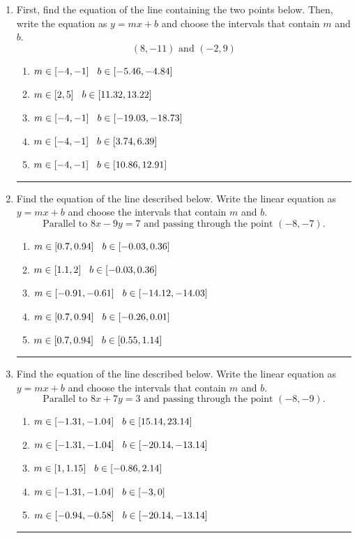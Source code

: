 \documentclass[14pt]{extbook}
\newcommand{\litem}[1]{\item#1\hspace*{-1cm}\rule{\textwidth}{0.4pt}}
\begin{document}
\begin{enumerate}
\litem{
First, find the equation of the line containing the two points below. Then, write the equation as $ y=mx+b $ and choose the intervals that contain $m$ and $b$.\[ (8, -11) \text{ and } (-2, 9) \]\begin{enumerate}[label=\Alph*.]
\item \( m \in [-4, -1] \hspace*{3mm} b \in [-5.46, -4.84] \)
\item \( m \in [2, 5] \hspace*{3mm} b \in [11.32, 13.22] \)
\item \( m \in [-4, -1] \hspace*{3mm} b \in [-19.03, -18.73] \)
\item \( m \in [-4, -1] \hspace*{3mm} b \in [3.74, 6.39] \)
\item \( m \in [-4, -1] \hspace*{3mm} b \in [10.86, 12.91] \)

\end{enumerate} }
\litem{
Find the equation of the line described below. Write the linear equation as $ y=mx+b $ and choose the intervals that contain $m$ and $b$.\[ \text{Parallel to } 8 x - 9 y = 7 \text{ and passing through the point } (-8, -7). \]\begin{enumerate}[label=\Alph*.]
\item \( m \in [0.7, 0.94] \hspace*{3mm} b \in [-0.03, 0.36] \)
\item \( m \in [1.1, 2] \hspace*{3mm} b \in [-0.03, 0.36] \)
\item \( m \in [-0.91, -0.61] \hspace*{3mm} b \in [-14.12, -14.03] \)
\item \( m \in [0.7, 0.94] \hspace*{3mm} b \in [-0.26, 0.01] \)
\item \( m \in [0.7, 0.94] \hspace*{3mm} b \in [0.55, 1.14] \)

\end{enumerate} }
\litem{
Find the equation of the line described below. Write the linear equation as $ y=mx+b $ and choose the intervals that contain $m$ and $b$.\[ \text{Parallel to } 8 x + 7 y = 3 \text{ and passing through the point } (-8, -9). \]\begin{enumerate}[label=\Alph*.]
\item \( m \in [-1.31, -1.04] \hspace*{3mm} b \in [15.14, 23.14] \)
\item \( m \in [-1.31, -1.04] \hspace*{3mm} b \in [-20.14, -13.14] \)
\item \( m \in [1, 1.15] \hspace*{3mm} b \in [-0.86, 2.14] \)
\item \( m \in [-1.31, -1.04] \hspace*{3mm} b \in [-3, 0] \)
\item \( m \in [-0.94, -0.58] \hspace*{3mm} b \in [-20.14, -13.14] \)


\end{enumerate}}
\end{enumerate}
\end{document}
